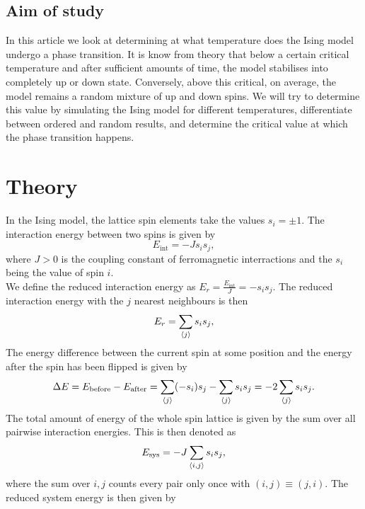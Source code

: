 \documentclass[twocolumn,a4paper,aps,amsmath,amssymb,floatfix,superscriptaddress]{revtex4-2}
\begin{document}
    \subsection{Aim of study}
        In this article we look at determining at what temperature does the Ising model undergo a phase transition. It is know from theory that below a certain critical temperature and after sufficient amounts of time, the model stabilises into completely up or down state. Conversely, above this critical, on average, the model remains a random mixture of up and down spins. \cite{Blundell2010}
        We will try to determine this value by simulating the Ising model for different temperatures, differentiate between ordered and random results, and determine the critical value at which the phase transition happens.
    
\section{Theory}\label{theory}
    In the Ising model, the lattice spin elements take the values $s_i = \pm 1$.
    The interaction energy between two spins is given by
    \begin{equation}
        E_{\text{int}} = -Js_is_j,
    \end{equation}
    where $J>0$ is the coupling constant of ferromagnetic interractions and the $s_i$ being the value of spin $i$.\\
    We define the reduced interaction energy as $E_r = \frac{E_{\text{int}}}{J} = -s_is_j$.
    The reduced interaction energy with the $j$ nearest neighbours is then
    \begin{equation}
        E_r = \sum_{\braket{j}}s_is_j, \label{neighbour_interaction_energy}
    \end{equation}
    The energy difference between the current spin at some position and the energy after the spin has been flipped is given by
    \begin{equation}
        \Delta E = E_{\text{before}} - E_{\text{after}} = \sum_{\braket{j}}(-s_i)s_j - \sum_{\braket{j}}s_is_j = -2\sum_{\braket{j}}s_is_j. \label{spin_flip_energy_delta}
    \end{equation}
    The total amount of energy of the whole spin lattice is given by the sum over all pairwise interaction energies. This is then denoted as
    \begin{equation}
        E_{\text{sys}} = -J\sum_{\braket{i, j}}s_is_j,
    \end{equation}
    where the sum over $i, j$ counts every pair only once with $(i, j) \equiv (j, i)$. The reduced system energy is then given by
\end{document}
